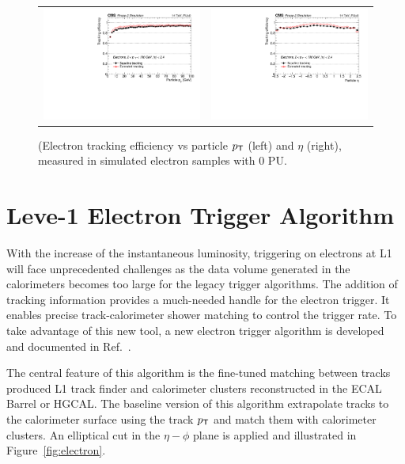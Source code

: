  \begin{figure}[tbh!]
 \begin{center}
  \begin{tabular}{cc}
   \includegraphics[width=.45\linewidth]{figures/Part2/Upgrade/L1TK_elec-pu0_eff_pt}&
   \includegraphics[width=.45\linewidth]{figures/Part2/Upgrade/L1TK_elec-pu0_eff_eta}
  \end{tabular}
  \caption{(Electron tracking efficiency vs particle $\pt$ (left) and $\eta$ (right), measured in simulated electron samples with 0 \ac{PU}.}
 \label{fig:electronperformance}
 \end{center}
\end{figure} 

\section{Leve-1 Electron Trigger Algorithm}
\label{sec:L1Ele}

With the increase of the instantaneous luminosity, triggering on electrons at \ac{L1} will face unprecedented challenges as the data volume generated in the calorimeters becomes too large for the legacy trigger algorithms. The addition of tracking information provides a much-needed handle for the electron trigger. It enables precise track-calorimeter shower matching to control the trigger rate. To take advantage of this new tool, a new electron trigger algorithm is developed and documented in Ref.~\cite{Zabi:2020gjd}. 

The central feature of this algorithm is the fine-tuned matching between tracks produced \ac{L1} track finder and calorimeter clusters reconstructed in the \ac{ECAL} Barrel or \ac{HGCAL}. The baseline version of this algorithm extrapolate tracks to the calorimeter surface using the track $\pt$ and match them with calorimeter clusters. An elliptical cut in the $\eta-\phi$ plane is applied and illustrated in Figure~\ref{fig:electron}.
  
